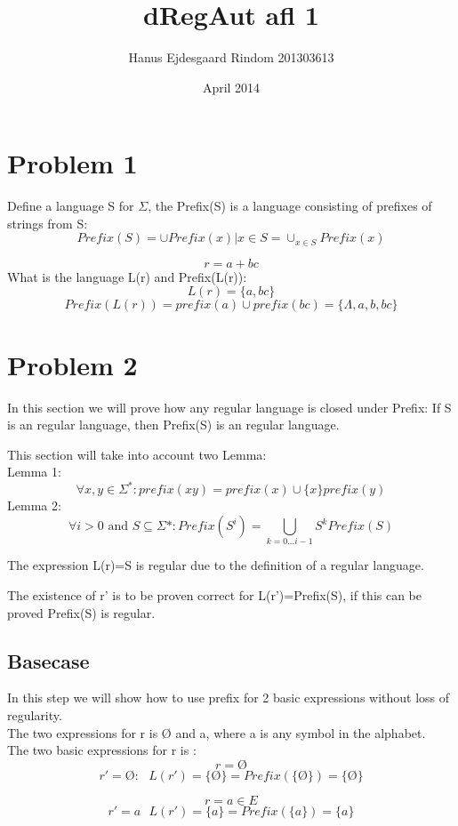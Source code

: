 \documentclass{article}
\title{dRegAut afl 1}
\author{Hanus Ejdesgaard Rindom 201303613}
\date{April 2014}
\begin{document}
\maketitle

\section{Problem 1}
    Define a language S for $ \Sigma $, the Prefix(S) is a language consisting of prefixes of strings from S:
        $$ Prefix(S)=\cup Prefix(x) | x \in S= \cup_{x \in S} Prefix(x) $$
        
        $$ r=a+bc $$
    What is the language L(r) and Prefix(L(r)):\\
        $$ L(r)= \{a,bc\} $$
        $$ Prefix(L(r))= prefix(a) \cup prefix(bc) = \{\Lambda,a,b,bc\}$$
        
\section{Problem 2}
    In this section we will prove how any regular language is closed under Prefix: If S is an regular language, then Prefix(S) is an regular language.
    
    This section will take into account two Lemma:\\
    Lemma 1: $$ \forall x,y \in \Sigma^{*}: prefix(xy)=prefix(x) \cup \{x\}prefix(y) $$
    Lemma 2: $$ \forall i>0 \text{ and } S \subseteq \Sigma{*}: Prefix(S^i)= {\bigcup}_{k=0...i-1} S^k Prefix(S) $$
    
    The expression L(r)=S is regular due to the definition of a regular language.
    
    The existence of r' is to be proven correct for L(r')=Prefix(S), if this can be proved Prefix(S) is regular.
    
\subsection*{Basecase}
    In this step we will show how to use prefix for 2 basic expressions without loss    of regularity.\\
    The two expressions for r is Ø and a, where a is any symbol in the alphabet.\\
    The two basic expressions for r is :
        $$ r=Ø $$
        $$ r'=Ø: \text{ } L(r')=\{Ø\}=Prefix(\{Ø\})=\{Ø\}  $$
    
        $$ r=a \in E $$
        $$ r'=a \text{ } L(r')=\{a\}=Prefix(\{a\})=\{a\} $$
    
\end{document}
